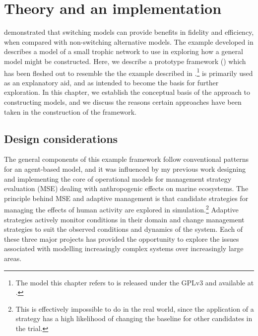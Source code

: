 

\chapter[THEORY AND AN EXAMPLE IMPLEMENTATION]{Theory and an 
implementation}
\WeAreOn{\cfive}\label{explicitmodel}


\Ctwo demonstrated that switching models can provide benefits in
fidelity and efficiency, when compared with non-switching alternative
models.  The example developed in \Cthree describes a model of a small
trophic network to use in exploring how a general model might be
constructed. Here, we describe a prototype framework (\ReModel) which
has been fleshed out to resemble the the example described
in \Cthree.\footnote{The model this chapter refers to is released
under the GPLv3 and available at \repos.} \ReModel is primarily used
as an explanatory aid, and as intended to become the basis for further
exploration. In this chapter, we establish the conceptual basis of the
approach to constructing models, and we discuss the reasons certain
approaches have been taken in the construction of the
framework.  

\section{Design considerations}
The general components of this example framework follow conventional
patterns for an agent-based model, and it was influenced by my
previous work \citep{lyne1994pmez5, gray2006nws, gray2014} designing
and implementing the core of operational models for management
strategy evaluation (MSE) dealing with anthropogenic effects on
marine ecosystems.  The principle behind MSE and adaptive management
is that candidate strategies for managing the effects of human
activity are explored in simulation.\footnote{This is effectively
impossible to do in the real world, since the application of a
strategy has a high likelihood of changing the baseline for other
candidates in the trial.} Adaptive strategies actively monitor
conditions in their domain and change management strategies to suit
the observed conditions and dynamics of the
system. \citep{walters1976,smith1993,polacheck1999,sainsbury2000,keith2011}
Each of these three major projects has provided the opportunity to
explore the issues associated with modelling increasingly complex
systems over increasingly large areas.

